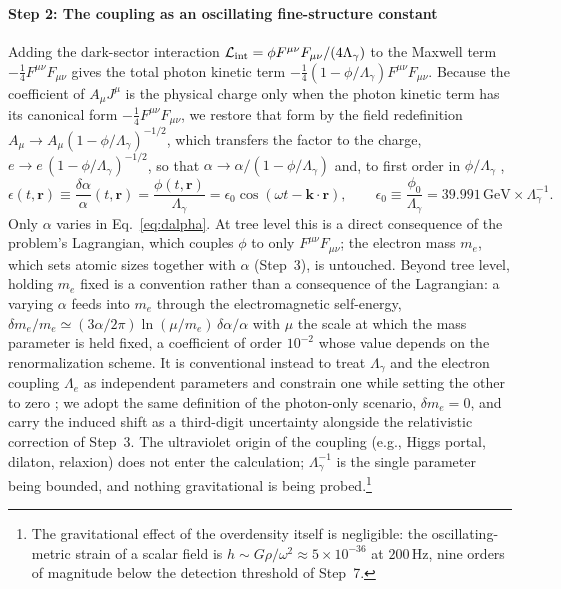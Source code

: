 \paragraph*{Step 2: The coupling as an oscillating fine-structure constant}
Adding the dark-sector interaction $\mathcal L_{\rm int}=\phi F^{\mu\nu}F_{\mu\nu}/(4\Lambda_\gamma)$ to the Maxwell term $-\tfrac14F^{\mu\nu}F_{\mu\nu}$ gives the total photon kinetic term $-\tfrac14(1-\phi/\Lambda_\gamma)F^{\mu\nu}F_{\mu\nu}$. Because the coefficient of $A_\mu J^\mu$ is the physical charge only when the photon kinetic term has its canonical form $-\tfrac14F^{\mu\nu}F_{\mu\nu}$, we restore that form by the field redefinition $A_\mu\to A_\mu(1-\phi/\Lambda_\gamma)^{-1/2}$, which transfers the factor to the charge, $e\to e\,(1-\phi/\Lambda_\gamma)^{-1/2}$, so that $\alpha\to\alpha/(1-\phi/\Lambda_\gamma)$ and, to first order in $\phi/\Lambda_\gamma$ \citep[see also e.g.,][]{DamourDonoghue2010,GroteStadnik2019},
%
\begin{equation}
\epsilon(t,\mathbf r)\equiv\frac{\delta\alpha}{\alpha}(t,\mathbf r)=\frac{\phi(t,\mathbf r)}{\Lambda_\gamma}=\epsilon_0\cos(\omega t-\mathbf k\cdot\mathbf r),\qquad \epsilon_0\equiv\frac{\phi_0}{\Lambda_\gamma}=39.991\,\mathrm{GeV}\times\Lambda_\gamma^{-1}.
\label{eq:dalpha}
\end{equation}
%
Only $\alpha$ varies in Eq.~\eqref{eq:dalpha}. At tree level this is a direct consequence of the problem's Lagrangian, which couples $\phi$ to only $F^{\mu\nu}F_{\mu\nu}$; the electron mass $m_e$, which sets atomic sizes together with $\alpha$ (Step~3), is untouched. Beyond tree level, holding $m_e$ fixed is a convention rather than a consequence of the Lagrangian: a varying $\alpha$ feeds into $m_e$ through the electromagnetic self-energy, $\delta m_e/m_e\simeq(3\alpha/2\pi)\ln(\mu/m_e)\,\delta\alpha/\alpha$ with $\mu$ the scale at which the mass parameter is held fixed, a coefficient of order $10^{-2}$ whose value depends on the renormalization scheme. It is conventional instead to treat $\Lambda_\gamma$ and the electron coupling $\Lambda_e$ as independent parameters and constrain one while setting the other to zero \citep{GroteStadnik2019,Vermeulen2021}; we adopt the same definition of the photon-only scenario, $\delta m_e=0$, and carry the induced shift as a third-digit uncertainty alongside the relativistic correction of Step~3. The ultraviolet origin of the coupling (e.g., Higgs portal, dilaton, relaxion) does not enter the calculation; $\Lambda_\gamma^{-1}$ is the single parameter being bounded, and nothing gravitational is being probed.\footnote{The gravitational effect of the overdensity itself is negligible: the oscillating-metric strain of a scalar field is $h\sim G\rho/\omega^2\approx5\times10^{-36}$ at $200\,\mathrm{Hz}$, nine orders of magnitude below the detection threshold of Step~7.}

